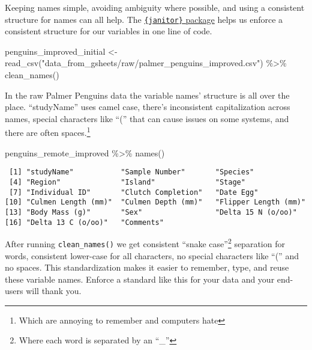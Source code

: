 \documentclass[
  letterpaper,
  DIV=11,
  numbers=noendperiod]{scrreprt}
\newenvironment{Shaded}{\begin{snugshade}}{\end{snugshade}}
\newcommand{\FunctionTok}[1]{\textcolor[rgb]{0.28,0.35,0.67}{#1}}
\newcommand{\NormalTok}[1]{\textcolor[rgb]{0.00,0.23,0.31}{#1}}
\newcommand{\OtherTok}[1]{\textcolor[rgb]{0.00,0.23,0.31}{#1}}
\newcommand{\SpecialCharTok}[1]{\textcolor[rgb]{0.37,0.37,0.37}{#1}}
\newcommand{\StringTok}[1]{\textcolor[rgb]{0.13,0.47,0.30}{#1}}
\begin{document}
Keeping names simple, avoiding ambiguity where possible, and using a
consistent structure for names can all help. The
\href{https://cran.r-project.org/web/packages/janitor/vignettes/janitor.html}{\texttt{\{janitor\}}
package} helps us enforce a consistent structure for our variables in
one line of code.

\begin{Shaded}
\begin{Highlighting}[]
\NormalTok{penguins\_improved\_initial }\OtherTok{\textless{}{-}} 
  \FunctionTok{read\_csv}\NormalTok{(}\StringTok{"data\_from\_gsheets/raw/palmer\_penguins\_improved.csv"}\NormalTok{) }\SpecialCharTok{\%\textgreater{}\%} 
  \FunctionTok{clean\_names}\NormalTok{()}
\end{Highlighting}
\end{Shaded}

In the raw Palmer Penguins data the variable names' structure is all
over the place. ``studyName'' uses camel case, there's inconsistent
capitalization across names, special characters like ``('' that can
cause issues on some systems, and there are often spaces.\footnote{Which
  are annoying to remember and computers hate}

\begin{Shaded}
\begin{Highlighting}[]
\NormalTok{penguins\_remote\_improved }\SpecialCharTok{\%\textgreater{}\%} 
  \FunctionTok{names}\NormalTok{()}
\end{Highlighting}
\end{Shaded}

\begin{verbatim}
 [1] "studyName"           "Sample Number"       "Species"            
 [4] "Region"              "Island"              "Stage"              
 [7] "Individual ID"       "Clutch Completion"   "Date Egg"           
[10] "Culmen Length (mm)"  "Culmen Depth (mm)"   "Flipper Length (mm)"
[13] "Body Mass (g)"       "Sex"                 "Delta 15 N (o/oo)"  
[16] "Delta 13 C (o/oo)"   "Comments"           
\end{verbatim}

After running \texttt{clean\_names()} we get consistent ``snake
case''\footnote{Where each word is separated by an ``\_''} separation
for words, consistent lower-case for all characters, no special
characters like ``('' and no spaces. This standardization makes it
easier to remember, type, and reuse these variable names. Enforce a
standard like this for your data and your end-users will thank you.
\end{document}
